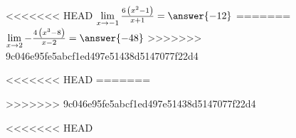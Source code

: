 {\begin{problem}
{\begin{problem}
{\begin{problem}
{\begin{problem}
{\begin{problem}
{\begin{problem}
{\begin{problem}
{\begin{problem}
{\begin{problem}
{\begin{problem}
{\begin{problem}
{\begin{problem}
{\begin{problem}
{\begin{problem}
{\begin{problem}
{\begin{problem}
{\begin{problem}
{\begin{problem}
{\begin{problem}
{\begin{problem}
{\begin{problem}
{\begin{problem}
{\begin{problem}
{\begin{problem}
{\begin{problem}
{\begin{problem}


<<<<<<< HEAD
$\lim\limits_{x \rightarrow {-1}} {\frac{6 \, {\left(x^{2} - 1\right)}}{x + 1}} = \answer{-12}$
=======
$\lim\limits_{x \rightarrow {2}} {-\frac{4 \, {\left(x^{3} - 8\right)}}{x - 2}} = \answer{-48}$
>>>>>>> 9c046e95fe5abcf1ed497e51438d5147077f22d4
\end{problem}}



<<<<<<< HEAD
=======



>>>>>>> 9c046e95fe5abcf1ed497e51438d5147077f22d4








<<<<<<< HEAD


\end{problem}}
\end{problem}}
\end{problem}}
\end{problem}}
\end{problem}}
\end{problem}}
\end{problem}}
\end{problem}}
\end{problem}}
\end{problem}}
\end{problem}}
\end{problem}}
\end{problem}}
\end{problem}}
\end{problem}}
\end{problem}}
\end{problem}}
\end{problem}}
\end{problem}}
\end{problem}}
\end{problem}}
\end{problem}}
\end{problem}}
\end{problem}}
\end{problem}}
